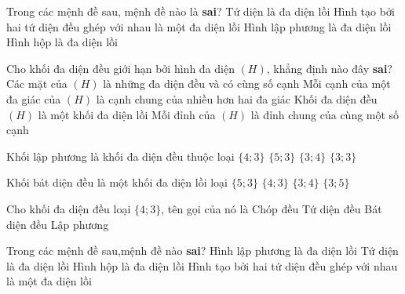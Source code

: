 \begin{ex}%
	Trong các mệnh đề sau, mệnh đề nào là \textbf{sai}?
	\choice
	{Tứ diện là đa diện lồi}
	{\True Hình tạo bởi hai tứ diện đều ghép với nhau là một đa diện lồi}
	{Hình lập phương là đa diện lồi}
	{Hình hộp là đa diện lồi}
\end{ex}
\begin{ex}%
	Cho khối đa diện đều giới hạn bởi hình đa diện $(H)$, khẳng định nào đây \textbf{sai}?
	\choice
	{Các mặt của $(H)$ là những đa diện đều và có cùng số cạnh}
	{\True Mỗi cạnh của một đa giác của $(H)$ là cạnh chung của nhiều hơn hai đa giác}
	{Khối đa diện đều $(H)$ là một khối đa diện lồi}
	{Mỗi đỉnh của $(H)$ là đỉnh chung của cùng một số cạnh}
\end{ex}
\begin{ex}%
	Khối lập phương là khối đa diện đều thuộc loại 
	\choice
	{\True $\{4;3\}$}
	{$\{5;3\}$}
	{$\{3;4\}$}
	{$\{3;3\}$}
\end{ex}
\begin{ex}%
	Khối bát diện đều là một khối đa diện lồi loại
	\choice
	{$\{5;3\}$}
	{$\{4;3\}$}
	{\True $\{3;4\}$}
	{$\{3;5\}$}
\end{ex}
\begin{ex}%
	Cho khối đa diện đều loại $\{4; 3\}$, tên gọi của nó là
	\choice
	{Chóp đều}
	{Tứ diện đều}
	{Bát diện đều}
	{\True Lập phương}
\end{ex}
\begin{ex}%
	Trong các mệnh đề sau,mệnh đề nào \textbf{sai}?
	\choice
	{Hình lập phương là đa diện lồi}
	{Tứ diện là đa diện lồi}
	{Hình hộp là đa diện lồi}
	{\True Hình tạo bởi hai tứ diện đều ghép với nhau là một đa diện lồi}
\end{ex}
